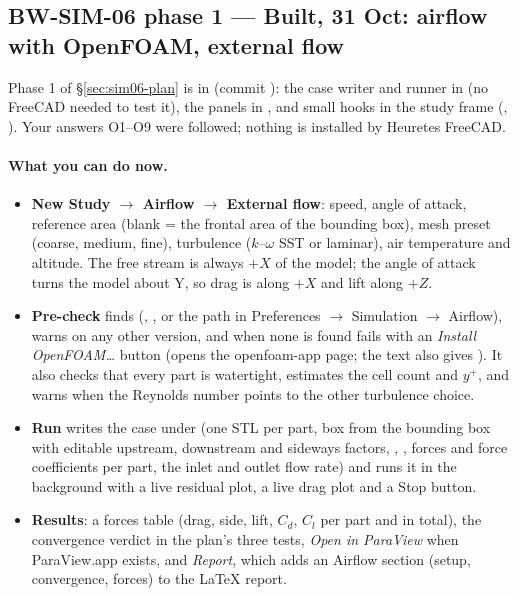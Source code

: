 \subsection{BW-SIM-06 phase 1 --- Built, 31 Oct: airflow with OpenFOAM, external flow}\label{sec:sim06-built}

Phase 1 of \S\ref{sec:sim06-plan} is in (commit ): the case writer and
runner in  (no FreeCAD needed to test it), the panels in
, and small hooks in the study frame (, ).
Your answers O1--O9 were followed; nothing is installed by Heuretes FreeCAD.

\paragraph{What you can do now.}
\begin{itemize}[nosep]
  \item \textbf{New Study $\to$ Airflow $\to$ External flow}: speed, angle of attack, reference area (blank = the
        frontal area of the bounding box), mesh preset (coarse, medium, fine), turbulence ($k$--$\omega$ SST or
        laminar), air temperature and altitude. The free stream is always $+X$ of the model; the angle of attack
        turns the model about Y, so drag is along $+X$ and lift along $+Z$.
  \item \textbf{Pre-check} finds  (, , or the
        path in Preferences $\to$ Simulation $\to$ Airflow), warns on any other version, and when none is found fails
        with an \emph{Install OpenFOAM\ldots} button (opens the openfoam-app page; the text also gives
        ). It also checks that every part is watertight, estimates
        the cell count and $y^+$, and warns when the Reynolds number points to the other turbulence choice.
  \item \textbf{Run} writes the case under 
        (one STL per part,  box from the bounding box with editable upstream, downstream and sideways
        factors, , , forces and force coefficients per part, the inlet and outlet flow
        rate) and runs it in the background with a live residual plot, a live drag plot and a Stop button.
  \item \textbf{Results}: a forces table (drag, side, lift, $C_d$, $C_l$ per part and in total), the convergence verdict
        in the plan's three tests, \emph{Open in ParaView} when ParaView.app exists, and \emph{Report}, which adds an
        Airflow section (setup, convergence, forces) to the LaTeX report.
\end{itemize}

